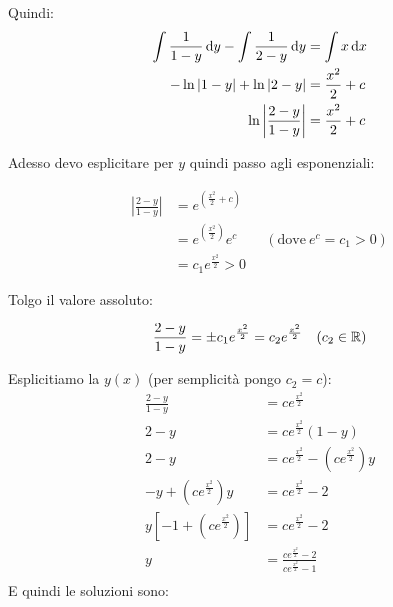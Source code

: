 \filbreak{}

Quindi:
\begin{align*}
    \int \frac{1}{1-y} \mathop{}\!\mathrm{d} y - \int \frac{1}{2-y} \mathop{}\!\mathrm{d} y & = \int x \mathop{}\!\mathrm{d} x      \\
    -\ln{|1-y|} + \ln{|2-y|}                                & = \frac{x ^{2}}{2} +c \\
    \ln{\left| \frac{2-y}{1-y} \right|}                     & = \frac{x ^{2}}{2} +c
\end{align*}

Adesso devo esplicitare per \(y\) quindi passo agli esponenziali:

\begin{align*}
    \left| \frac{2-y}{1-y} \right| & = e^{(\frac{x ^{2}}{2} +c)}                                       \\
                                   & = e^{(\frac{x ^{2}}{2})} e^{c} \qquad (\text{dove}\ e^{c}=c_1 >0) \\
                                   & = c_1 e^{\frac{x ^{2}}{2}} >0
\end{align*}

Tolgo il valore assoluto:

\[
    \frac{2-y}{1-y} = \pm c_1 e^{\frac{x ^{2}}{2} } = c_2 e ^{\frac{x ^{2}}{2} } \quad (c_2 \in \mathbb{R} )
\]

Esplicitiamo la \(y(x)\) (per semplicità pongo \(c_2 = c\)):
\begin{align*}
    \frac{2-y}{1-y}                                              & = ce^{\frac{x ^{2}}{2} }                                           \\
    2-y                                                          & = ce^{\frac{x ^{2}}{2} } (1-y)                                     \\
    2-y                                                          & = ce^{\frac{x ^{2}}{2} } - \left( ce ^{\frac{x ^{2}}{2} } \right)y \\
    -y + \left( ce ^{\frac{x ^{2}}{2} } \right)y                 & = ce^{\frac{x ^{2}}{2} }-2                                         \\
    y \left[ -1 + \left( ce ^{\frac{x ^{2}}{2} } \right) \right] & = ce^{\frac{x ^{2}}{2} }-2                                         \\
    y                                                            & = \frac{ce^{\frac{x ^{2}}{2} }-2}{ce ^{\frac{x ^{2}}{2} }-1}       \\
\end{align*}
E quindi le soluzioni sono:

